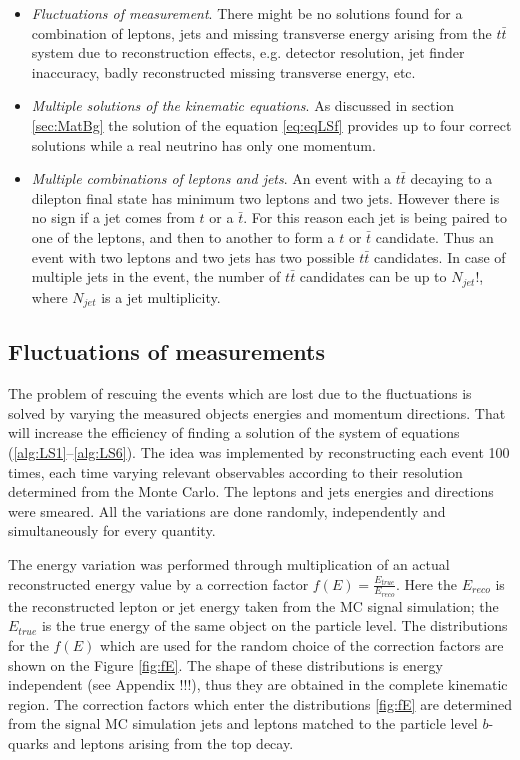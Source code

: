 \begin{itemize}
 \item \textit{Fluctuations of measurement}. There might be no solutions found for a combination
 of leptons, jets and missing transverse energy arising from the $t\bar{t}$ system due to reconstruction effects, e.g. detector resolution,
 jet finder inaccuracy, badly reconstructed missing transverse energy, etc.
 \item \textit{Multiple solutions of the kinematic equations}. As discussed in section \ref{sec:MatBg} the solution of the equation \ref{eq:eqLSf}
 provides up to four correct solutions while a real neutrino has only one momentum.
 \item \textit{Multiple combinations of leptons and jets}. An event with a $t\bar{t}$ decaying to a dilepton final state has minimum two leptons and two
 jets. However there is no sign if a jet comes from $t$ or a $\bar{t}$. For this reason each jet is being paired to one of the leptons, and then to another
 to form a $t$ or $\bar{t}$ candidate. Thus an event with two leptons and two jets has two possible $t\bar{t}$ candidates. In case of multiple jets
 in the event, the number of $t\bar{t}$ candidates can be up to $N_{jet}!$, where $N_{jet}$ is a jet multiplicity.
\end{itemize}


\subsection{Fluctuations of measurements}

The problem of rescuing the events which are lost due to the fluctuations is solved by varying the measured objects energies and
momentum directions. That will increase the efficiency of finding a solution of the system of equations (\ref{alg:LS1}--\ref{alg:LS6}). The idea was implemented by reconstructing
each event 100 times, each time varying relevant observables according to their resolution determined from the Monte Carlo.
The leptons and jets energies and directions were smeared. All the variations are done randomly, independently and simultaneously for every quantity.

The energy variation was performed through multiplication of an actual reconstructed energy value
by a correction factor $f(E) = \frac{E_{true}}{E_{reco}}$. Here the $E_{reco}$ is the reconstructed lepton or jet energy taken from the MC signal simulation;
the $E_{true}$ is the true energy of the same object on the particle level. The distributions for the $f(E)$ which are used for the random choice
of the correction factors are shown on the Figure \ref{fig:fE}. The shape of these distributions is energy independent (see Appendix !!!), thus they are obtained in
the complete kinematic region. The correction factors which enter the distributions \ref{fig:fE} are determined from the signal MC simulation jets and 
leptons matched to the particle level $b$-quarks and leptons arising from the top decay. 

